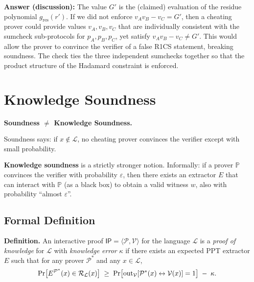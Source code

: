 \documentclass[11pt]{article}
\begin{document}
\medskip
\noindent\textbf{Answer (discussion):}  The value $G'$ is the (claimed) evaluation of the
residue polynomial $g_{\mathrm{res}}(r')$.  If we did not enforce $v_A v_B - v_C = G'$,
then a cheating prover could provide values $v_A, v_B, v_C$ that are individually
consistent with the sumcheck sub-protocols for $p_A, p_B, p_C$, yet satisfy
$v_A v_B - v_C \neq G'$.  This would allow the prover to convince the verifier of a false
R1CS statement, breaking soundness.  The check ties the three independent sumchecks
together so that the product structure of the Hadamard constraint is enforced.

\section{Knowledge Soundness}

\begin{importantbox}
  \textbf{Soundness $\neq$ Knowledge Soundness.}

  Soundness says: if $x \notin \mathcal{L}$, no cheating prover convinces the verifier
  except with small probability.

  \textbf{Knowledge soundness} is a strictly stronger notion.  Informally:
  if a prover $\mathbb{P}$ convinces the verifier with probability $\varepsilon$, then there
  exists an extractor $E$ that can interact with $\mathbb{P}$ (as a black box) to obtain a
  valid witness $w$, also with probability ``almost $\varepsilon$''.
\end{importantbox}

\subsection{Formal Definition}

\begin{definitionbox}
  \textbf{Definition.}  An interactive proof $\mathsf{IP} = \langle \mathcal{P}, \mathcal{V} \rangle$
  for the language $\mathcal{L}$ is a \emph{proof of knowledge} for $\mathcal{L}$ with
  \emph{knowledge error} $\kappa$ if there exists an expected PPT extractor $E$ such that
  for any prover $\mathcal{P}^*$ and any $x \in \mathcal{L}$,
  \[
    \Pr\bigl[E^{\mathcal{P}^*}(x) \in \mathcal{R}_{\mathcal{L}}(x)\bigr]
    \;\geq\;
    \Pr\bigl[\text{out}_{\mathcal{V}}[\mathcal{P}^*(x) \leftrightarrow \mathcal{V}(x)] = 1\bigr]
    \;-\; \kappa.
  \]
\end{definitionbox}
\end{document}
